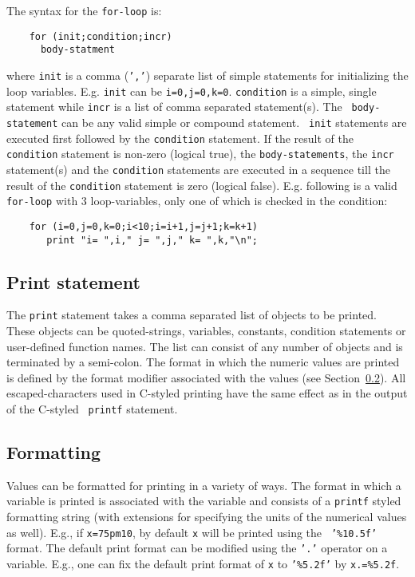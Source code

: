 \documentclass[11pt]{article}
\begin{document}
The syntax for the {\tt for-loop} is:
\begin{verbatim}
    for (init;condition;incr)
      body-statment
\end{verbatim}
where {\tt init} is a comma ({\tt ','}) separate list of simple
statements for initializing the loop variables.  E.g. {\tt init} can
be {\tt i=0,j=0,k=0}. {\tt condition} is a simple, single statement
while {\tt incr} is a list of comma separated statement(s). The {\tt
body-statement} can be any valid simple or compound statement.  {\tt
init} statements are executed first followed by the {\tt condition}
statement.  If the result of the {\tt condition} statement is non-zero
(logical true), the {\tt body-statements}, the {\tt incr} statement(s)
and the {\tt condition} statements are executed in a sequence till the
result of the {\tt condition} statement is zero (logical false).
E.g. following is a valid {\tt for-loop} with 3 loop-variables, only
one of which is checked in the condition:
\begin{verbatim}
    for (i=0,j=0,k=0;i<10;i=i+1,j=j+1;k=k+1) 
       print "i= ",i," j= ",j," k= ",k,"\n";
\end{verbatim}

\subsection{Print statement}
\label{PRINT}

The {\tt print} statement takes a comma separated list of objects to
be printed.  These objects can be quoted-strings, variables,
constants, condition statements or user-defined function names.  The
list can consist of any number of objects and is terminated by a
semi-colon.  The format in which the numeric values are printed is
defined by the format modifier associated with the values (see
Section~\ref{FORMATTING}).  All escaped-characters used in C-styled
printing have the same effect as in the output of the C-styled {\tt
printf} statement.

\subsection{Formatting}
\label{FORMATTING}

Values can be formatted for printing in a variety of ways.  The format
in which a variable is printed is associated with the variable and
consists of a {\tt printf} styled formatting string (with extensions
for specifying the units of the numerical values as well).  E.g., if
{\tt x=75pm10}, by default {\tt x} will be printed using the {\tt
'\%10.5f'} format.  The default print format can be modified using the
{\tt '.'} operator on a variable.  E.g., one can fix the default print
format of {\tt x} to {\tt '\%5.2f'} by {\tt x.=\%5.2f}.
\end{document}
